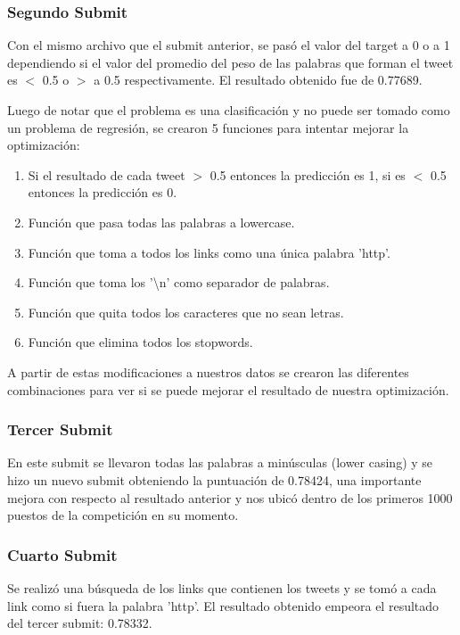 \documentclass[12pt]{article}
\begin{document}
\subsubsection{Segundo Submit}
Con el mismo archivo que el submit anterior, se pasó el valor del target a 0 o a 1 dependiendo si el valor del promedio del peso de las palabras que forman el tweet es $<$ 0.5 o $>$ a 0.5 respectivamente.
El resultado obtenido fue de 0.77689.

Luego de notar que el problema es una clasificación y no puede ser tomado como un problema de regresión, se crearon 5 funciones para intentar mejorar la optimización:

\begin{enumerate}
  \item Si el resultado de cada tweet $>$ 0.5 entonces la predicción es 1, si es $<$ 0.5 entonces la predicción es 0.
  \item Función que pasa todas las palabras a lowercase.
  \item Función que toma a todos los links como una única palabra 'http'.
  \item Función que toma los '\textbackslash n' como separador de palabras.
  \item Función que quita todos los caracteres que no sean letras.
  \item Función que elimina todos los stopwords.
\end{enumerate}
A partir de estas modificaciones a nuestros datos se crearon las diferentes combinaciones para ver si se puede mejorar el resultado de nuestra optimización.

\subsubsection{Tercer Submit}
En este submit se llevaron todas las palabras a minúsculas (lower casing) y se hizo un nuevo submit obteniendo la puntuación de 0.78424, una importante mejora con respecto al resultado anterior y nos ubicó dentro de los primeros 1000 puestos de la competición en su momento.


\subsubsection{Cuarto Submit}
Se realizó una búsqueda de los links que contienen los tweets y se tomó a cada link como si fuera la palabra 'http'. El resultado obtenido empeora el resultado del tercer submit: 0.78332.
\end{document}
